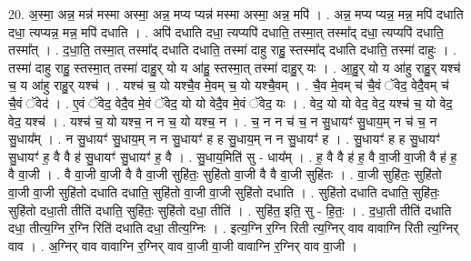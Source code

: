 \documentclass[17pt]{extarticle}
\begin{document}
20. अ॒स्मा॒ अन्न॒ मन्न॑ मस्मा अस्मा॒ अन्न॒ मप्य प्यन्न॑ मस्मा अस्मा॒ अन्न॒ मपि॑ । . अन्न॒ मप्य प्यन्न॒ मन्न॒ मपि॑ दधाति दधा॒ त्यप्यन्न॒ मन्न॒ मपि॑ दधाति । . अपि॑ दधाति दधा॒ त्यप्यपि॑ दधाति॒ तस्मा॒त् तस्मा᳚द् दधा॒ त्यप्यपि॑ दधाति॒ तस्मा᳚त् । . द॒धा॒ति॒ तस्मा॒त् तस्मा᳚द् दधाति दधाति॒ तस्मा॑ दाहु राहु॒ स्तस्मा᳚द् दधाति दधाति॒ तस्मा॑ दाहुः । . तस्मा॑ दाहु राहु॒ स्तस्मा॒त् तस्मा॑ दाहु॒र् यो य आ॑हु॒ स्तस्मा॒त् तस्मा॑ दाहु॒र् यः । . आ॒हु॒र् यो य आ॑हु राहु॒र् यश्च॑ च॒ य आ॑हु राहु॒र् यश्च॑ । . यश्च॑ च॒ यो यश्चै॒व मे॒वम् च॒ यो यश्चै॒वम् । . चै॒व मे॒वम् च॑ चै॒वं ॅवेद॒ वेदै॒वम् च॑ चै॒वं ॅवेद॑ । . ए॒वं ॅवेद॒ वेदै॒व मे॒वं ॅवेद॒ यो यो वेदै॒व मे॒वं ॅवेद॒ यः । . वेद॒ यो यो वेद॒ वेद॒ यश्च॑ च॒ यो वेद॒ वेद॒ यश्च॑ । . यश्च॑ च॒ यो यश्च॒ न न च॒ यो यश्च॒ न । . च॒ न न च॑ च॒ न सु॒धायꣳ॑ सु॒धाय॒म् न च॑ च॒ न सु॒धाय᳚म् । . न सु॒धायꣳ॑ सु॒धाय॒म् न न सु॒धायꣳ॑ ह ह सु॒धाय॒म् न न सु॒धायꣳ॑ ह । . सु॒धायꣳ॑ ह ह सु॒धायꣳ॑ सु॒धायꣳ॑ ह॒ वै वै ह॑ सु॒धायꣳ॑ सु॒धायꣳ॑ ह॒ वै । . सु॒धाय॒मिति॑ सु - धाय᳚म् । . ह॒ वै वै ह॑ ह॒ वै वा॒जी वा॒जी वै ह॑ ह॒ वै वा॒जी । . वै वा॒जी वा॒जी वै वै वा॒जी सुहि॑तः॒ सुहि॑तो वा॒जी वै वै वा॒जी सुहि॑तः । . वा॒जी सुहि॑तः॒ सुहि॑तो वा॒जी वा॒जी सुहि॑तो दधाति दधाति॒ सुहि॑तो वा॒जी वा॒जी सुहि॑तो दधाति । . सुहि॑तो दधाति दधाति॒ सुहि॑तः॒ सुहि॑तो दधा॒ती तीति॑ दधाति॒ सुहि॑तः॒ सुहि॑तो दधा॒ तीति॑ । . सुहि॑त॒ इति॒ सु - हि॒तः॒ । . द॒धा॒ती तीति॑ दधाति दधा॒ तीत्य॒ग्नि र॒ग्नि रिति॑ दधाति दधा॒ तीत्य॒ग्निः । . इत्य॒ग्नि र॒ग्नि रिती त्य॒ग्निर् वाव वावाग्नि रिती त्य॒ग्निर् वाव । . अ॒ग्निर् वाव वावाग्नि र॒ग्निर् वाव वा॒जी वा॒जी वावाग्नि र॒ग्निर् वाव वा॒जी । \newline
\end{document}
